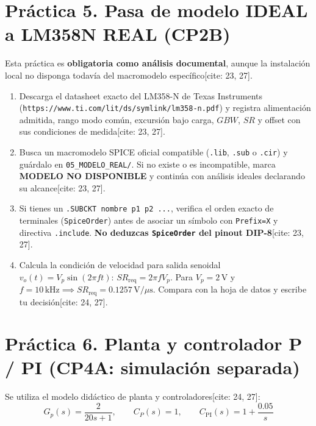 \documentclass[10pt, a4paper]{article}
\begin{document}
\section{Práctica 5. Pasa de modelo IDEAL a LM358N REAL (CP2B)}
Esta práctica es \textbf{obligatoria como análisis documental}, aunque la instalación local no disponga todavía del macromodelo específico[cite: 23, 27].
\begin{enumerate}[noitemsep, leftmargin=*]
    \item Descarga el datasheet exacto del LM358-N de Texas Instruments (\texttt{https://www.ti.com/lit/ds/symlink/lm358-n.pdf}) y registra alimentación admitida, rango modo común, excursión bajo carga, $GBW$, $SR$ y offset con sus condiciones de medida[cite: 23, 27].
    \item Busca un macromodelo SPICE oficial compatible (\texttt{.lib}, \texttt{.sub} o \texttt{.cir}) y guárdalo en \texttt{05\_MODELO\_REAL/}. Si no existe o es incompatible, marca \textbf{MODELO NO DISPONIBLE} y continúa con análisis ideales declarando su alcance[cite: 23, 27].
    \item Si tienes un \texttt{.SUBCKT nombre p1 p2 ...}, verifica el orden exacto de terminales (\texttt{SpiceOrder}) antes de asociar un símbolo con \texttt{Prefix=X} y directiva \texttt{.include}. \textbf{No deduzcas \texttt{SpiceOrder} del pinout DIP-8}[cite: 23, 27].
    \item Calcula la condición de velocidad para salida senoidal $v_o(t) = V_p\sin(2\pi f t)$: $SR_{\text{req}} = 2\pi f V_p$. Para $V_p = 2\,\text{V}$ y $f = 10\,\text{kHz} \implies SR_{\text{req}} = 0.1257\,\text{V/}\mu\text{s}$. Compara con la hoja de datos y escribe tu decisión[cite: 24, 27].
\end{enumerate}

\newpage
\section{Práctica 6. Planta y controlador P / PI (CP4A: simulación separada)}
Se utiliza el modelo didáctico de planta y controladores[cite: 24, 27]:
\begin{equation}
    G_p(s) = \frac{2}{20s + 1}, \qquad C_P(s) = 1, \qquad C_{\text{PI}}(s) = 1 + \frac{0.05}{s}
\end{equation}
\end{document}
